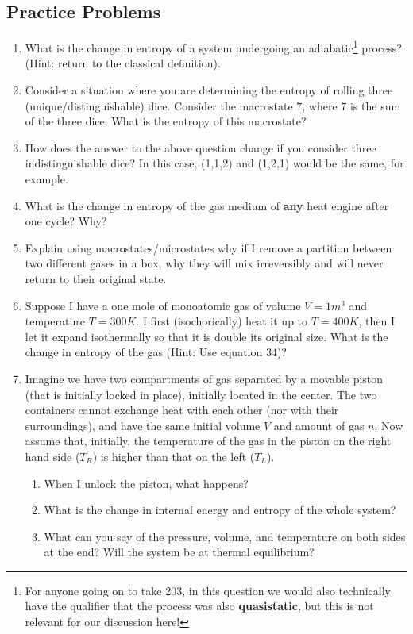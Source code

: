\subsection{Practice Problems}
\begin{enumerate}
    \item What is the change in entropy of a system undergoing an adiabatic\footnote{For anyone going on to take 203, in this question we would also technically have the qualifier that the process was also \textbf{quasistatic}, but this is not relevant for our discussion here!} process? (Hint: return to the classical definition).
    \item Consider a situation where you are determining the entropy of rolling three (unique/distinguishable) dice. Consider the macrostate $7$, where $7$ is the sum of the three dice. What is the entropy of this macrostate?
    \item How does the answer to the above question change if you consider three indistinguishable dice? In this case, (1,1,2) and (1,2,1) would be the same, for example.
    \item What is the change in entropy of the gas medium of \textbf{any} heat engine after one cycle? Why?
    \item Explain using macrostates/microstates why if I remove a partition between two different gases in a box, why they will mix irreversibly and will never return to their original state. 
    \item Suppose I have a one mole of monoatomic gas of volume $V = 1m^3$ and temperature $T = 300K$. I first (isochorically) heat it up to $T=400K$, then I let it expand isothermally so that it is double its original size. What is the change in entropy of the gas (Hint: Use equation 34)?
    \item Imagine we have two compartments of gas separated by a movable piston (that is initially locked in place), initially located in the center. The two containers cannot exchange heat with each other (nor with their surroundings), and have the same initial volume $V$ and amount of gas $n$. Now assume that, initially, the temperature of the gas in the piston on the right hand side ($T_R$) is higher than that on the left ($T_L$). 
    \begin{enumerate}
        \item When I unlock the piston, what happens?
        \item What is the change in internal energy and entropy of the whole system?
        \item What can you say of the pressure, volume, and temperature on both sides at the end? Will the system be at thermal equilibrium?
    \end{enumerate}  
    

\end{enumerate}
